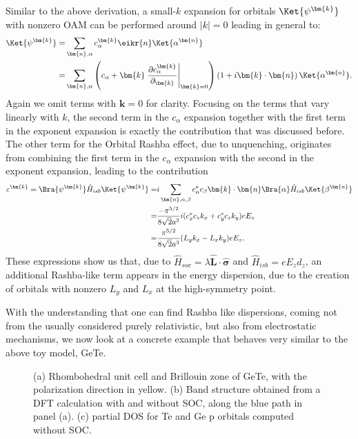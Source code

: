 Similar to the above derivation, a small-$k$ expansion for orbitals $\Ket{\psi^{\bm{k}}}$ with nonzero OAM can be performed around $|k|=0$ leading in general to:
\begin{align}
	\Ket{\psi^{\bm{k}}} =& \sum_{\bm{n},\alpha} c_\alpha^{\bm{k}} \eikr{n} \Ket{\alpha^{\bm{n}}}\\
	=& \sum_{\bm{n},\alpha} \left(c_\alpha + \bm{k}\left.\frac{\partial c_\alpha^{\bm{k}}}{\partial_{\bm{k}}}\right\rvert_{\bm{k}=0} \right)\left(1 + i\bm{k}\cdot\bm{n}\right)\Ket{\alpha^{\bm{n}}}.
\end{align}
Again we omit terms with $\bm{k}=0$ for clarity.
Focusing on the terms that vary linearly with $k$, the second term in the $c_{\alpha}$ expansion together with the first term in the exponent expansion is exactly the contribution that was discussed before.
The other term for the Orbital Rashba effect, due to unquenching, originates from combining the first term in the $c_\alpha$ expansion with the second in the exponent expansion, leading to the contribution
\begin{align}
	\label{eq:d_z_from_OAM}
	\varepsilon^{\bm{k}} = \Bra{\psi^{\bm{k}}} \hat{H}_{isb} \Ket{\psi^{\bm{k}}} =&  i\sum_{\bm{n},\alpha,\beta} c_\alpha^* c_\beta \bm{k}\cdot\bm{n}\Bra{\alpha} \hat{H}_{isb} \Ket{\beta^{\bm{n}}}\\
	=&\frac{-\pi^{5/2}}{8\sqrt{2}a^3}i(c^*_xc_zk_x + c^*_yc_z k_y) e E_z  \\
	=&\frac{\pi^{5/2}}{8\sqrt{2}a^3}(L_y k_x - L_x k_y) e E_z.
\end{align}
These expressions show us that, due to ${\hat{H}_{soc} = \lambda \hat{\bm{L}}\cdot\hat{\bm{\sigma}}}$ and $\hat{H}_{isb} = e E_z d_z$, an additional Rashba-like term appears in the energy dispersion, due to the creation of orbitals with nonzero $L_y$ and $L_x$ at the high-symmetry point.

With the understanding that one can find Rashba like dispersions, coming not from the usually considered purely relativistic, but also from electrostatic mechanisms, we now look at a concrete example that behaves very similar to the above toy model, GeTe.

\begin{figure}[h]
{}
\caption{\label{fig:Rashba_BZBSDOS}(a) Rhombohedral unit cell and Brillouin zone of GeTe, with the polarization direction in yellow. (b) Band structure obtained from a DFT calculation with and without SOC, along the blue path in panel (a). (c) partial DOS for Te and Ge p orbitals computed without SOC.}
\end{figure}
